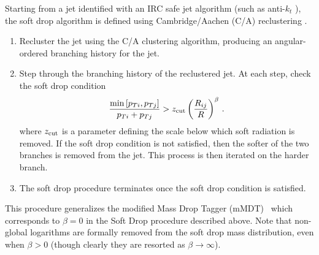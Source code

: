 Starting from a jet identified with an IRC safe jet algorithm (such as
anti-$k_t$ \cite{Cacciari:2008gp}), the soft drop algorithm is defined
using Cambridge/Aachen (C/A) reclustering
\cite{Dokshitzer:1997in,Wobisch:1998wt,Wobisch:2000dk}.  \begin{enumerate}

\item Recluster the jet using the C/A clustering algorithm, producing an angular-ordered branching history for the jet.

\item Step through the branching history of the reclustered jet.  At each step, check the soft drop condition
\begin{align}\label{eq:sd_cut}
\frac{\min\left[ p_{Ti}, p_{Tj}  \right]}{p_{Ti}+p_{Tj}}> z_{\rm cut} \left(   \frac{R_{ij}}{R}\right)^\beta \,.
\end{align}
where $z_{\rm cut}$ is a parameter defining the scale below which soft radiation is removed.  If the soft drop condition is not satisfied, then the softer of the two branches is removed from the jet.  This process is then iterated on the harder branch.

\item The soft drop procedure terminates once the soft drop condition is satisfied.

\end{enumerate}

\noindent This procedure generalizes the modified Mass Drop
  Tagger (mMDT)~\cite{Dasgupta:2013ihk} which corresponds to $\beta=0$ in the
  Soft Drop procedure described above.  Note that non-global logarithms are formally removed from the soft drop mass distribution, even when $\beta>0$ (though clearly they are resorted as $\beta\rightarrow\infty$).






